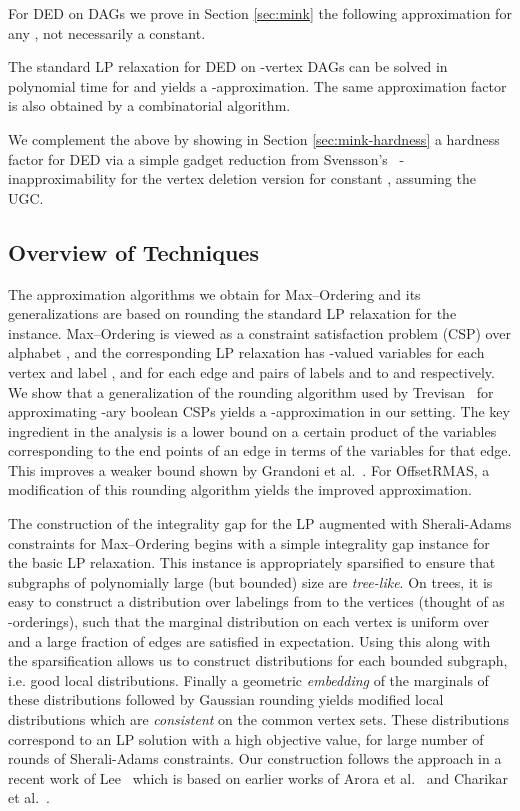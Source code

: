 \documentclass[oribibl]{llncs}
\newcommand{\maxk}{{\sc Max--Ordering}\xspace}
\newcommand{\mink}{{\sc DED}\xspace}
\newcommand{\rmasoff}{{\sc OffsetRMAS}\xspace}
\begin{document}
For \mink on DAGs we prove in Section \ref{sec:mink} 
the following approximation for any ,
not necessarily a constant.
\begin{theorem}\label{thm:deletion1}
	The standard LP relaxation for \mink on -vertex DAGs can be
	solved in polynomial time for  and yields
	a -approximation. The same approximation factor is also
	obtained by a combinatorial algorithm.
\end{theorem}
We complement the above by showing in Section \ref{sec:mink-hardness} a
 hardness factor for \mink via a
 simple gadget reduction from
Svensson's~\cite{svensson2012hardness} -inapproximability 
for the vertex deletion version for constant , assuming the
UGC.

\subsection{Overview of Techniques}

The approximation algorithms we obtain for \maxk and its
generalizations are based on rounding the standard LP relaxation for
the instance. \maxk is viewed as a constraint satisfaction problem (CSP) 
over alphabet
, and the corresponding LP relaxation has -valued variables 
 for each vertex  and label , and  for
each edge  and pairs of labels  and  to  and 
respectively. We show that a generalization of the 
rounding algorithm used by Trevisan~\cite{trevisan1998parallel} for approximating 
-ary boolean CSPs yields a
-approximation in our setting. The key
ingredient in the analysis is a lower bound
on a certain product of the  variables 
corresponding to the end points of an edge 
in terms of the  variables for that edge. This improves 
a weaker bound shown by Grandoni et al.~\cite{grandoni2015lp}.
For \rmasoff, a
modification of this rounding algorithm yields the improved
approximation. 

The construction of the integrality gap for the LP
augmented with  Sherali-Adams constraints for \maxk begins
with a simple integrality gap instance for the basic LP
relaxation. This instance is appropriately sparsified  to ensure
that subgraphs of polynomially 
large (but bounded) size are \emph{tree-like}.
On trees, it is easy to construct a distribution over  
labelings from 
to the vertices (thought of as -orderings), 
such that the marginal distribution on each vertex is uniform
over  and a large fraction of edges are satisfied in expectation.
Using this along with the sparsification allows us to construct 
distributions for each bounded subgraph, i.e. good local distributions.
Finally a geometric 
\emph{embedding} of the marginals of these distributions
followed by Gaussian 
rounding yields modified local distributions which are
\emph{consistent} on the common vertex sets. These distributions
correspond to an LP solution with a high objective value,  
for large number of rounds of Sherali-Adams constraints. Our
construction follows the approach in a recent work of
Lee~\cite{lee2014hardness} which is based on earlier works of Arora et
al.~\cite{arora2002proving} and Charikar et al.~\cite{charikar2009integrality}.
\end{document}

